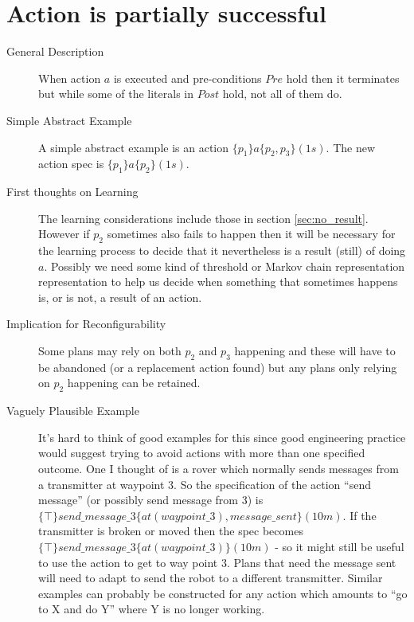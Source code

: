 \documentclass{blue-book}
\newcommand{\actionspec}[4]{\ensuremath{\{#1\}#2\{#3\}(#4)}}
\begin{document}
\section{Action is partially successful}
\label{sec:partial_result}
\begin{description}
\item[General Description] When action $a$ is executed and pre-conditions $Pre$ hold then it terminates but while some of the literals in $Post$ hold, not all of them do.

\item[Simple Abstract Example] A simple abstract example is an action \actionspec{p_1}{a}{p_2, p_3}{1s}.  The new action spec is \actionspec{p_1}{a}{p_2}{1s}.

\item[First thoughts on Learning] The learning considerations include those in section \ref{sec:no_result}.  However if $p_2$ sometimes also fails to happen then it will be necessary for the learning process to decide that it nevertheless is a result (still) of doing $a$.  Possibly we need some kind of threshold or Markov chain representation representation to help us decide when something that sometimes happens is, or is not, a result of an action.

\item[Implication for Reconfigurability]  Some plans may rely on both $p_2$ and $p_3$ happening and these will have to be abandoned (or a replacement action found) but any plans only relying on $p_2$ happening can be retained.

\item[Vaguely Plausible Example] It's hard to think of good examples for this since good engineering practice would suggest trying to avoid actions with more than one specified outcome.  One I thought of is a rover which normally sends messages from a transmitter at waypoint 3.  So the specification of the action ``send message'' (or possibly send message from 3) is \actionspec{\top}{send\_message\_3}{at(waypoint\_3), message\_sent}{10m}.  If the transmitter is broken or moved then the spec becomes \actionspec{\top}{send\_message\_3}{at(waypoint\_3)}{10m} - so it might still be useful to use the action to get to way point 3.  Plans that need the message sent will need to adapt to send the robot to a different transmitter.  Similar examples can probably be constructed for any action which amounts to ``go to X and do Y'' where Y is no longer working.
\end{description}
\end{document}
